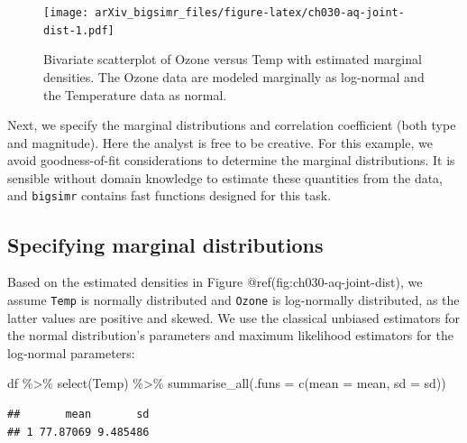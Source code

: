 \documentclass{article}
\newenvironment{Shaded}{\begin{snugshade}}{\end{snugshade}}
\newcommand{\AttributeTok}[1]{\textcolor[rgb]{0.77,0.63,0.00}{#1}}
\newcommand{\FunctionTok}[1]{\textcolor[rgb]{0.00,0.00,0.00}{#1}}
\newcommand{\NormalTok}[1]{#1}
\newcommand{\SpecialCharTok}[1]{\textcolor[rgb]{0.00,0.00,0.00}{#1}}
\begin{document}
\begin{figure}
\centering
\texttt{[image: arXiv\_bigsimr\_files/figure-latex/ch030-aq-joint-dist-1.pdf]}
\caption{Bivariate scatterplot of Ozone versus Temp with estimated
marginal densities. The Ozone data are modeled marginally as log-normal
and the Temperature data as normal.}
\end{figure}

Next, we specify the marginal distributions and correlation coefficient
(both type and magnitude). Here the analyst is free to be creative. For
this example, we avoid goodness-of-fit considerations to determine the
marginal distributions. It is sensible without domain knowledge to
estimate these quantities from the data, and \texttt{bigsimr} contains
fast functions designed for this task.

\hypertarget{specifying-marginal-distributions}{%
\subsection{Specifying marginal
distributions}\label{specifying-marginal-distributions}}

Based on the estimated densities in Figure
@ref(fig:ch030-aq-joint-dist), we assume \texttt{Temp} is normally
distributed and \texttt{Ozone} is log-normally distributed, as the
latter values are positive and skewed. We use the classical unbiased
estimators for the normal distribution's parameters and maximum
likelihood estimators for the log-normal parameters:

\begin{Shaded}
\begin{Highlighting}[]
\NormalTok{df }\SpecialCharTok{\%\textgreater{}\%} \FunctionTok{select}\NormalTok{(Temp) }\SpecialCharTok{\%\textgreater{}\%} 
  \FunctionTok{summarise\_all}\NormalTok{(}\AttributeTok{.funs =} \FunctionTok{c}\NormalTok{(}\AttributeTok{mean =}\NormalTok{ mean, }\AttributeTok{sd =}\NormalTok{ sd))}
\end{Highlighting}
\end{Shaded}

\begin{verbatim}
##       mean       sd
## 1 77.87069 9.485486
\end{verbatim}
\end{document}
